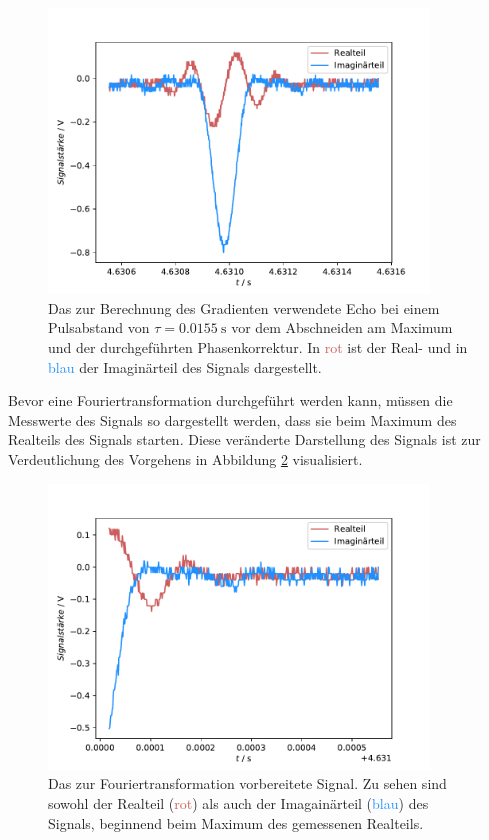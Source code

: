 \begin{figure}[H]
  \centering
  \includegraphics[width=0.9\textwidth]{../Auswertung/echo_vorher.pdf}
  \caption{Das zur Berechnung des Gradienten verwendete Echo bei einem Pulsabstand von $\tau = \SI{0.0155}{\second}$ 
  vor dem Abschneiden am Maximum und der durchgeführten 
  Phasenkorrektur. In \textcolor{indianred}{rot} ist der Real- und in \textcolor{dodgerblue}{blau} der Imaginärteil des Signals dargestellt.}
  \label{fig:echo_vorher}
\end{figure} \noindent
Bevor eine Fouriertransformation durchgeführt werden kann, müssen die Messwerte des Signals so dargestellt werden, dass sie 
beim Maximum des Realteils des Signals starten. Diese veränderte Darstellung des Signals ist zur Verdeutlichung des Vorgehens in 
Abbildung \ref{fig:echo_ab} visualisiert.
\begin{figure}[H]
  \centering
  \includegraphics[width=0.9\textwidth]{../Auswertung/echo_abgeschnitten.pdf}
  \caption{Das zur Fouriertransformation vorbereitete Signal. Zu sehen sind sowohl der Realteil (\textcolor{indianred}{rot}) als auch der 
  Imagainärteil (\textcolor{dodgerblue}{blau}) des Signals, beginnend beim Maximum des gemessenen Realteils.}
  \label{fig:echo_ab}
\end{figure} \noindent
